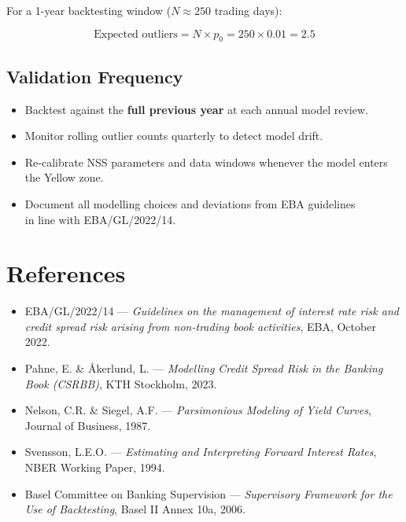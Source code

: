 \documentclass[11pt, a4paper]{article}
\begin{document}
For a 1-year backtesting window ($N \approx 250$ trading days):

\[
    \text{Expected outliers} = N \times p_0 = 250 \times 0.01 = 2.5
\]

\subsection{Validation Frequency}

\begin{itemize}[noitemsep]
    \item Backtest against the \textbf{full previous year} at each annual model review.
    \item Monitor rolling outlier counts quarterly to detect model drift.
    \item Re-calibrate NSS parameters and data windows whenever the model enters the Yellow zone.
    \item Document all modelling choices and deviations from EBA guidelines\\
          in line with \mbox{EBA/GL/2022/14}.
\end{itemize}

\section*{References}

\begin{itemize}[noitemsep]
    \item EBA/GL/2022/14 — \textit{Guidelines on the management of interest rate risk and credit spread risk arising from non-trading book activities}, EBA, October 2022.
    \item Pahne, E. \& Åkerlund, L. — \textit{Modelling Credit Spread Risk in the Banking Book (CSRBB)}, KTH Stockholm, 2023.
    \item Nelson, C.R. \& Siegel, A.F. — \textit{Parsimonious Modeling of Yield Curves}, Journal of Business, 1987.
    \item Svensson, L.E.O. — \textit{Estimating and Interpreting Forward Interest Rates}, NBER Working Paper, 1994.
    \item Basel Committee on Banking Supervision — \textit{Supervisory Framework for the Use of Backtesting}, Basel II Annex 10a, 2006.
\end{itemize}
\end{document}

